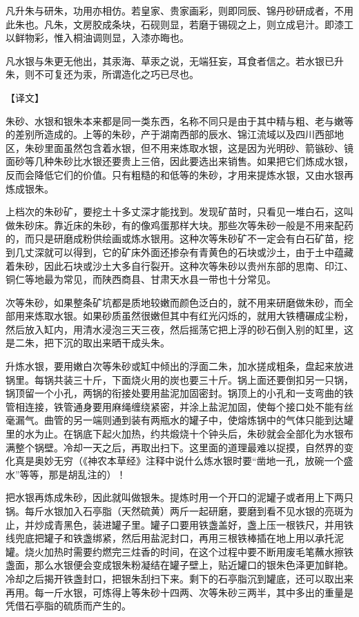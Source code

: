\documentclass[12pt,UTF8]{ctexbook}
\begin{document}
凡升朱与研朱，功用亦相仿。若皇家、贵家画彩，则即同辰、锦丹砂研成者，不用此朱也。凡朱，文房胶成条块，石砚则显，若磨于锡砚之上，则立成皂汁。即漆工以鲜物彩，惟入桐油调则显，入漆亦晦也。

凡水银与朱更无他出，其汞海、草汞之说，无端狂妄，耳食者信之。若水银已升朱，则不可复还为汞，所谓造化之巧已尽也。

【译文】

朱砂、水银和银朱本来都是同一类东西，名称不同只是由于其中精与粗、老与嫩等的差别所造成的。上等的朱砂，产于湖南西部的辰水、锦江流域以及四川西部地区，朱砂里面虽然包含着水银，但不用来炼取水银，这是因为光明砂、箭镞砂、镜面砂等几种朱砂比水银还要贵上三倍，因此要选出来销售。如果把它们炼成水银，反而会降低它们的价值。只有粗糙的和低等的朱砂，才用来提炼水银，又由水银再炼成银朱。

上档次的朱砂矿，要挖土十多丈深才能找到。发现矿苗时，只看见一堆白石，这叫做朱砂床。靠近床的朱砂，有的像鸡蛋那样大块。那些次等朱砂一般是不用来配药的，而只是研磨成粉供绘画或炼水银用。这种次等朱砂矿不一定会有白石矿苗，挖到几丈深就可以得到，它的矿床外面还掺杂有青黄色的石块或沙土，由于土中蕴藏着朱砂，因此石块或沙土大多自行裂开。这种次等朱砂以贵州东部的思南、印江、铜仁等地最为常见，而陕西商县、甘肃天水县一带也十分常见。

次等朱砂，如果整条矿坑都是质地较嫩而颜色泛白的，就不用来研磨做朱砂，而全部用来炼取水银。如果砂质虽然很嫩但其中有红光闪烁的，就用大铁槽碾成尘粉，然后放入缸内，用清水浸泡三天三夜，然后摇荡它把上浮的砂石倒入别的缸里，这是二朱，把下沉的取出来晒干成头朱。

升炼水银，要用嫩白次等朱砂或缸中倾出的浮面二朱，加水搓成粗条，盘起来放进锅里。每锅共装三十斤，下面烧火用的炭也要三十斤。锅上面还要倒扣另一只锅，锅顶留一个小孔，两锅的衔接处要用盐泥加固密封。锅顶上的小孔和一支弯曲的铁管相连接，铁管通身要用麻绳缠绕紧密，并涂上盐泥加固，使每个接口处不能有丝毫漏气。曲管的另一端则通到装有两瓶水的罐子中，使熔炼锅中的气体只能到达罐里的水为止。在锅底下起火加热，约共煅烧十个钟头后，朱砂就会全部化为水银布满整个锅壁。冷却一天之后，再取出扫下。这里面的道理最难以捉摸，自然界的变化真是奥妙无穷（《神农本草经》注释中说什么炼水银时要“凿地一孔，放碗一个盛水”等等，那是胡乱注的）！

把水银再炼成朱砂，因此就叫做银朱。提炼时用一个开口的泥罐子或者用上下两只锅。每斤水银加入石亭脂（天然硫黄）两斤一起研磨，要磨到看不见水银的亮斑为止，并炒成青黑色，装进罐子里。罐子口要用铁盏盖好，盏上压一根铁尺，并用铁线兜底把罐子和铁盏绑紧，然后用盐泥封口，再用三根铁棒插在地上用以承托泥罐。烧火加热时需要约燃完三炷香的时间，在这个过程中要不断用废毛笔蘸水擦铁盏面，那么水银便会变成银朱粉凝结在罐子壁上，贴近罐口的银朱色泽更加鲜艳。冷却之后揭开铁盏封口，把银朱刮扫下来。剩下的石亭脂沉到罐底，还可以取出来再用。每一斤水银，可炼得上等朱砂十四两、次等朱砂三两半，其中多出的重量是凭借石亭脂的硫质而产生的。
\end{document}
